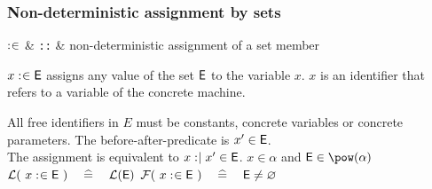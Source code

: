 \begin{samepage}
\subsubsection{Non-deterministic assignment by sets}

\begin{rrnames}
  $\mathrel{:\mkern1mu\in}$ & \texttt{::} & non-deterministic assignment of a set member
\end{rrnames}
\begin{rodinrefentry}
  \rrdesc
    $x \mathrel{:\mkern1mu\in} \textsf{E}$ assigns any value of the
    set $\textsf{E}$ to the variable $x$. $x$ is an identifier that refers to a variable
    of the concrete machine.

    All free identifiers in $E$ must be constants, concrete variables or concrete parameters.
  \rrdef
    The before-after-predicate is $x' \in \textsf{E}$. \\
    The assignment is equivalent to
    $x \mathrel{:\mkern1mu\mid} x' \in \textsf{E}$.
  \rrtypes
    $x\in\alpha$ and $\expre\in\pow(\alpha)$
  \rrwd
    $\mathcal{L}(~x \mathrel{:\mkern1mu\in}\textsf{E}~) \quad\mathrel{\widehat=}\quad \mathcal{L}(\textsf{E})$
  \rrfis
    $\mathcal{F}(~x \mathrel{:\mkern1mu\in} \textsf{E}~) \quad\mathrel{\widehat=}\quad \textsf{E}\neq\mathord\varnothing$
\end{rodinrefentry}
\end{samepage}

